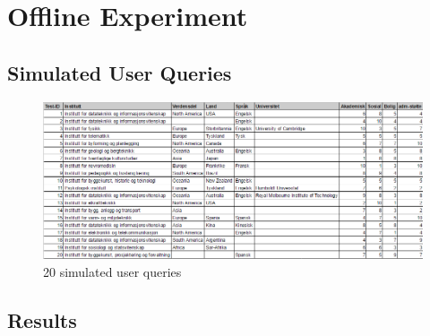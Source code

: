 \chapter{Offline Experiment}

\section{Simulated User Queries}
\label{app:user_queries}

\begin{figure}[h]
    \centering
    \includegraphics[width=1.0\textwidth]{fig/simulated_queries.PNG}
    \caption[]{20 simulated user queries}
    \label{fig:my_label}
\end{figure}


\section{Results}

